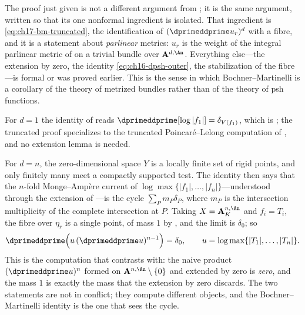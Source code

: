 \begin{remark}
\label{rem:ch17-bm-second-proof}
The proof just given is not a different argument from
; it is the same argument, written so
that its one nonformal ingredient is isolated.  That ingredient is
\eqref{eq:ch17-bm-truncated}, the identification of
$(\dprimeddprime u_r)^d$ with a fibre, and it is a statement about
\emph{parlinear} metrics: $u_r$ is the weight of the integral parlinear
metric of  on a trivial bundle over
$\mathbf A^{d,\An}$.  Everything else---the extension by zero, the
identity \eqref{eq:ch16-dpsh-outer}, the stabilization of the fibre---is
formal or was proved earlier.  This is the sense in which
Bochner--Martinelli is a corollary of the theory of metrized bundles rather
than of the theory of psh functions.
\end{remark}

\begin{example}
\label{ex:ch17-bm-extremes}
For $d=1$ the identity of  reads
$\dprimeddprime[\log|f_1|]=\delta_{V(f_1)}$, which is
; the truncated proof specializes to the
truncated Poincar\'e--Lelong computation of
, and no extension lemma is needed.

For $d=n$, the zero-dimensional space $Y$ is a locally finite set of
rigid points, and only finitely many meet a compactly supported test.
The identity then says
that the $n$-fold Monge--Amp\`ere current of
$\log\max\{|f_1|,\dots,|f_n|\}$---understood through the extension of
---is the cycle $\sum_Pm_P\delta_P$, where
$m_P$ is the intersection multiplicity of the complete intersection at
$P$.  Taking $X=\mathbf A^{n,\An}_K$ and $f_i=T_i$, the fibre over
$\eta_r$ is a single point, of mass $1$ by
, and the limit is $\delta_0$; so
\[
 \dprimeddprime\Bigl(u\,(\dprimeddprime u)^{n-1}\Bigr)=\delta_0,
 \qquad u=\log\max\{|T_1|,\dots,|T_n|\}.
\]
This is the computation that  contrasts with:
the naive product $(\dprimeddprime u)^n$ formed on
$\mathbf A^{n,\An}\setminus\{0\}$ and extended by zero is \emph{zero}, and
the mass $1$ is exactly the mass that the extension by zero discards.  The
two statements are not in conflict; they compute different objects, and the
Bochner--Martinelli identity is the one that sees the cycle.
\end{example}


